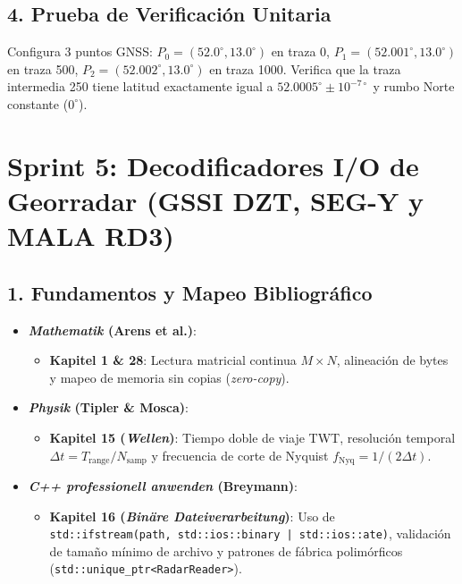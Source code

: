 \documentclass[11pt,a4paper]{article}
\begin{document}
\subsection{4. Prueba de Verificación Unitaria}
Configura 3 puntos GNSS:
$P_0 = (52.0^\circ, 13.0^\circ)$ en traza 0,
$P_1 = (52.001^\circ, 13.0^\circ)$ en traza 500,
$P_2 = (52.002^\circ, 13.0^\circ)$ en traza 1000.
Verifica que la traza intermedia 250 tiene latitud exactamente igual a $52.0005^\circ \pm 10^{-7\circ}$ y rumbo Norte constante ($0^\circ$).

\section{Sprint 5: Decodificadores I/O de Georradar (GSSI DZT, SEG-Y y MALA RD3)}

\subsection{1. Fundamentos y Mapeo Bibliográfico}
\begin{itemize}
    \item \textbf{\textit{Mathematik} (Arens et al.)}:
    \begin{itemize}
        \item \textbf{Kapitel 1 \& 28}: Lectura matricial continua $M \times N$, alineación de bytes y mapeo de memoria sin copias (\textit{zero-copy}).
    \end{itemize}
    \item \textbf{\textit{Physik} (Tipler \& Mosca)}:
    \begin{itemize}
        \item \textbf{Kapitel 15 (\textit{Wellen})}: Tiempo doble de viaje TWT, resolución temporal $\Delta t = T_{\text{range}} / N_{\text{samp}}$ y frecuencia de corte de Nyquist $f_{\text{Nyq}} = 1 / (2\Delta t)$.
    \end{itemize}
    \item \textbf{\textit{C++ professionell anwenden} (Breymann)}:
    \begin{itemize}
        \item \textbf{Kapitel 16 (\textit{Binäre Dateiverarbeitung})}: Uso de \texttt{std::ifstream(path, std::ios::binary | std::ios::ate)}, validación de tamaño mínimo de archivo y patrones de fábrica polimórficos (\texttt{std::unique\_ptr<RadarReader>}).
    \end{itemize}
\end{itemize}
\end{document}
